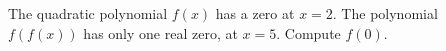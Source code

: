 The quadratic polynomial $f(x)$ has a zero at $x=2$. The polynomial $f(f(x))$ has only one real zero, at $x=5$. Compute $f(0)$.
